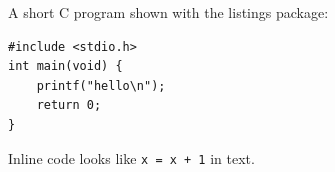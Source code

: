\documentclass{article}
\begin{document}
A short C program shown with the listings package:
\begin{lstlisting}
#include <stdio.h>
int main(void) {
    printf("hello\n");
    return 0;
}
\end{lstlisting}
Inline code looks like \lstinline|x = x + 1| in text.
\end{document}
